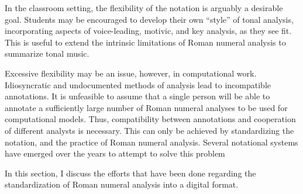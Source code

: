 

In the classroom setting, the flexibility of the notation is
arguably a desirable goal. Students may be encouraged to
develop their own ``style'' of tonal analysis, incorporating
aspects of voice-leading, motivic, and key analysis, as they
see fit. This is useful to extend the intrinsic limitations
of Roman numeral analysis to summarize tonal music.

Excessive flexibility may be an issue, however, in
computational work. Idiosyncratic and undocumented methods
of analysis lead to incompatible annotations. It is
unfeasible to assume that a single person will be able to
annotate a sufficiently large number of Roman numeral
analyses to be used for computational models. Thus,
compatibility between annotations and cooperation of
different analysts is necessary. This can only be achieved
by standardizing the notation, and the practice of Roman
numeral analysis. Several notational systems have emerged
over the years to attempt to solve this problem

In this section, I discuss the efforts that have been done
regarding the standardization of Roman numeral analysis into
a digital format.
